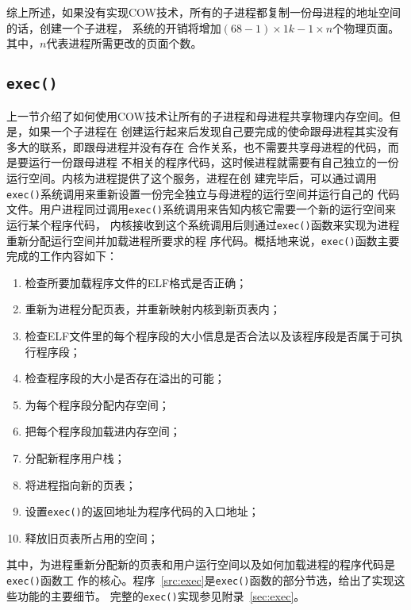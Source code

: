 \documentclass{swfcthesismscctex}
\begin{document}
综上所述，如果没有实现COW技术，所有的子进程都复制一份母进程的地址空间的话，创建一个子进程，
系统的开销将增加$(68-1)\times{}1k - 1\times{}n$个物理页面。其中，$n$代表进程所需更改的页面个数。

\subsection{\texttt{exec()}}

上一节介绍了如何使用COW技术让所有的子进程和母进程共享物理内存空间。但是，如果一个子进程在
创建运行起来后发现自己要完成的使命跟母进程其实没有多大的联系，即跟母进程并没有存在
合作关系，也不需要共享母进程的代码，而是要运行一份跟母进程
不相关的程序代码，这时候进程就需要有自己独立的一份运行空间。内核为进程提供了这个服务，进程在创
建完毕后，可以通过调用\texttt{exec()}系统调用来重新设置一份完全独立与母进程的运行空间并运行自己的
代码文件。用户进程同过调用\texttt{exec()}系统调用来告知内核它需要一个新的运行空间来运行某个程序代码，
内核接收到这个系统调用后则通过\texttt{exec()}函数来实现为进程重新分配运行空间并加载进程所要求的程
序代码。概括地来说，\texttt{exec()}函数主要完成的工作内容如下：

\begin{enumerate}
\item 检查所要加载程序文件的ELF格式是否正确；
\item 重新为进程分配页表，并重新映射内核到新页表内；
\item 检查ELF文件里的每个程序段的大小信息是否合法以及该程序段是否属于可执行程序段；
\item 检查程序段的大小是否存在溢出的可能；
\item 为每个程序段分配内存空间；
\item 把每个程序段加载进内存空间；
\item 分配新程序用户栈；
\item 将进程指向新的页表；
\item 设置\texttt{exec()}的返回地址为程序代码的入口地址；
\item 释放旧页表所占用的空间；
\end{enumerate}
其中，为进程重新分配新的页表和用户运行空间以及如何加载进程的程序代码是\texttt{exec()}函数工
作的核心。程序~\ref{src:exec}是\texttt{exec()}函数的部分节选，给出了实现这些功能的主要细节。
完整的\texttt{exec()}实现参见附录~\ref{sec:exec}。
\end{document}
